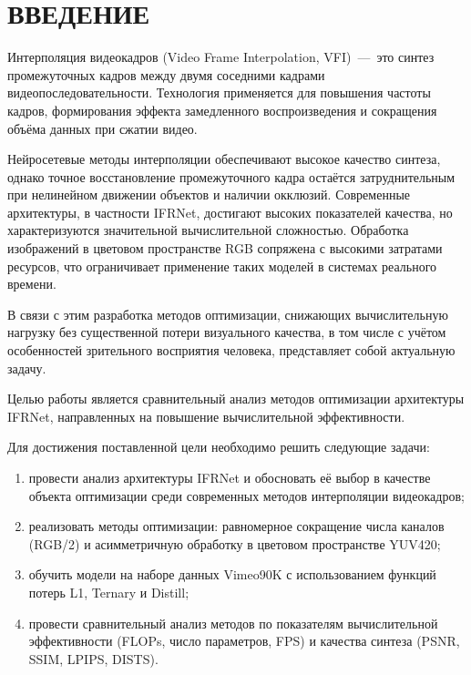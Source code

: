 \chapter*{ВВЕДЕНИЕ}

Интерполяция видеокадров (Video Frame Interpolation, VFI)~---~это синтез промежуточных кадров между двумя соседними кадрами видеопоследовательности. Технология применяется для повышения частоты кадров, формирования эффекта замедленного воспроизведения и сокращения объёма данных при сжатии видео.

Нейросетевые методы интерполяции обеспечивают высокое качество синтеза, однако точное восстановление промежуточного кадра остаётся затруднительным при нелинейном движении объектов и наличии окклюзий. Современные архитектуры, в частности IFRNet, достигают высоких показателей качества, но характеризуются значительной вычислительной сложностью. Обработка изображений в цветовом пространстве RGB сопряжена с высокими затратами ресурсов, что ограничивает применение таких моделей в системах реального времени.

В связи с этим разработка методов оптимизации, снижающих вычислительную нагрузку без существенной потери визуального качества, в том числе с учётом особенностей зрительного восприятия человека, представляет собой актуальную задачу.

Целью работы является сравнительный анализ методов оптимизации архитектуры IFRNet, направленных на повышение вычислительной эффективности.

Для достижения поставленной цели необходимо решить следующие задачи:
\begin{enumerate}
	\item провести анализ архитектуры IFRNet и обосновать её выбор в качестве объекта оптимизации среди современных методов интерполяции видеокадров;
	\item реализовать методы оптимизации: равномерное сокращение числа каналов (RGB/2) и асимметричную обработку в цветовом пространстве YUV420;
	\item обучить модели на наборе данных Vimeo90K с использованием функций потерь L1, Ternary и Distill;
	\item провести сравнительный анализ методов по показателям вычислительной эффективности (FLOPs, число параметров, FPS) и качества синтеза (PSNR, SSIM, LPIPS, DISTS).
\end{enumerate}
